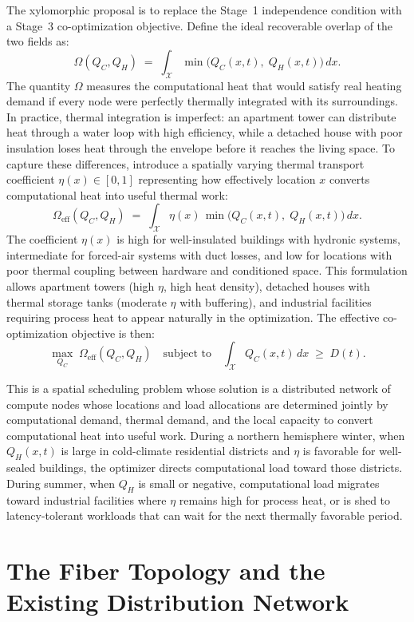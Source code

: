 \documentclass[12pt, oneside]{article}
\begin{document}
The xylomorphic proposal is to replace the Stage~1 independence condition with a Stage~3 co-optimization objective. Define the ideal recoverable overlap of the two fields as:
\[
\Omega(Q_C, Q_H) \;=\; \int_{\mathcal{X}} \min\bigl(Q_C(x,t),\; Q_H(x,t)\bigr)\, dx.
\]
The quantity $\Omega$ measures the computational heat that would satisfy real heating demand if every node were perfectly thermally integrated with its surroundings. In practice, thermal integration is imperfect: an apartment tower can distribute heat through a water loop with high efficiency, while a detached house with poor insulation loses heat through the envelope before it reaches the living space. To capture these differences, introduce a spatially varying thermal transport coefficient $\eta(x) \in [0,1]$ representing how effectively location $x$ converts computational heat into useful thermal work:
\[
\Omega_{\text{eff}}(Q_C, Q_H) \;=\; \int_{\mathcal{X}} \eta(x)\,\min\bigl(Q_C(x,t),\; Q_H(x,t)\bigr)\, dx.
\]
The coefficient $\eta(x)$ is high for well-insulated buildings with hydronic systems, intermediate for forced-air systems with duct losses, and low for locations with poor thermal coupling between hardware and conditioned space. This formulation allows apartment towers (high $\eta$, high heat density), detached houses with thermal storage tanks (moderate $\eta$ with buffering), and industrial facilities requiring process heat to appear naturally in the optimization. The effective co-optimization objective is then:
\[
\max_{Q_C} \;\Omega_{\text{eff}}(Q_C, Q_H) \quad \text{subject to} \quad \int_{\mathcal{X}} Q_C(x,t)\, dx \;\geq\; D(t).
\]

This is a spatial scheduling problem whose solution is a distributed network of compute nodes whose locations and load allocations are determined jointly by computational demand, thermal demand, and the local capacity to convert computational heat into useful work. During a northern hemisphere winter, when $Q_H(x,t)$ is large in cold-climate residential districts and $\eta$ is favorable for well-sealed buildings, the optimizer directs computational load toward those districts. During summer, when $Q_H$ is small or negative, computational load migrates toward industrial facilities where $\eta$ remains high for process heat, or is shed to latency-tolerant workloads that can wait for the next thermally favorable period.

\section{The Fiber Topology and the Existing Distribution Network}
\end{document}
